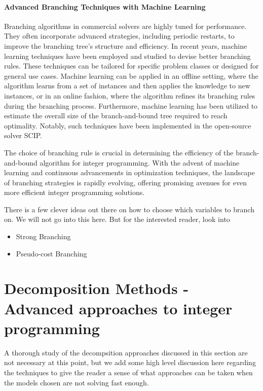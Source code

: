 \paragraph{Advanced Branching Techniques with Machine Learning}

Branching algorithms in commercial solvers are highly tuned for performance. They often incorporate advanced strategies, including periodic restarts, to improve the branching tree's structure and efficiency. In recent years, machine learning techniques have been employed and studied to devise better branching rules. These techniques can be tailored for specific problem classes or designed for general use cases. Machine learning can be applied in an offline setting, where the algorithm learns from a set of instances and then applies the knowledge to new instances, or in an online fashion, where the algorithm refines its branching rules during the branching process. Furthermore, machine learning has been utilized to estimate the overall size of the branch-and-bound tree required to reach optimality. Notably, such techniques have been implemented in the open-source solver SCIP.


The choice of branching rule is crucial in determining the efficiency of the branch-and-bound algorithm for integer programming. With the advent of machine learning and continuous advancements in optimization techniques, the landscape of branching strategies is rapidly evolving, offering promising avenues for even more efficient integer programming solutions.


There is a few clever ideas out there on how to choose which variables to branch on.  We will not go into this here.  But for the interested reader, look into 
\begin{itemize}
\item Strong Branching
\item Pseudo-cost Branching
\end{itemize}

\section{Decomposition Methods - Advanced approaches to integer programming}
\begin{outcome}
A thorough study of the decompsition approaches discussed in this section are not necessary at this point, but we add some high level discussion here regarding the techniques to give the reader a sense of what approaches can be taken when the models chosen are not solving fast enough.  
\end{outcome}


